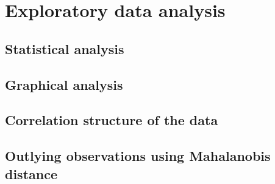 \section{Exploratory data analysis}
\subsection{Statistical analysis}



\subsection{Graphical analysis}

\subsection{Correlation structure of the data}

\subsection{Outlying observations using Mahalanobis distance}

